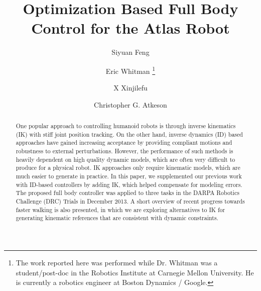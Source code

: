 \documentclass{ws-ijhr}
\begin{document}

%
\catchline{}{}{}{}{}
%

\title{Optimization Based Full Body Control for the Atlas Robot}

\author{Siyuan Feng}
\address{The Robotics Institute, Carnegie Mellon 
  University, 5000 Forbes Avenue, Pittsburgh, PA 15213, USA \\
	sfeng@cs.cmu.edu}

\author{Eric Whitman
\footnote{The work reported here was performed while Dr. Whitman was 
a student/post-doc in the Robotics Institute at Carnegie Mellon 
University.  
He is currently a robotics engineer at Boston Dynamics / Google.
}}
\address{
	Boston Dynamics / Google, 78 Fourth Avenue, Waltham, MA 02451, USA \\
	ewhitman@bostondynamics.com}

\author{X Xinjilefu}
\address{The Robotics Institute, Carnegie Mellon 
  University, 5000 Forbes Avenue, Pittsburgh, PA 15213, USA \\
	xxinjile@andrew.cmu.edu} 

\author{Christopher G. Atkeson}
\address{The Robotics Institute, Carnegie Mellon 
  University, 5000 Forbes Avenue, Pittsburgh, PA 15213, USA \\
	cga@cs.cmu.edu} 

\maketitle

\begin{history}
\end{history}

\begin{abstract}
One popular approach to controlling humanoid robots is through inverse kinematics 
(IK) with stiff joint position tracking. On the other hand, inverse dynamics 
(ID) based approaches have gained increasing acceptance by providing compliant 
motions and robustness to external perturbations. However, the performance of 
such methods is heavily dependent on high quality dynamic models, which are 
often very difficult to produce for a physical robot. IK approaches only 
require kinematic models, which are much easier to generate in practice. In this 
paper, we supplemented our previous work with ID-based controllers by adding IK, 
which helped compensate for modeling errors. The proposed full body controller 
was applied to three tasks in the DARPA Robotics Challenge (DRC) Trials in December
2013. A short overview of recent progress towards faster walking is also 
presented, in which we are exploring alternatives to IK for generating kinematic 
references that are consistent with dynamic constraints.
\end{abstract}
\end{document}
